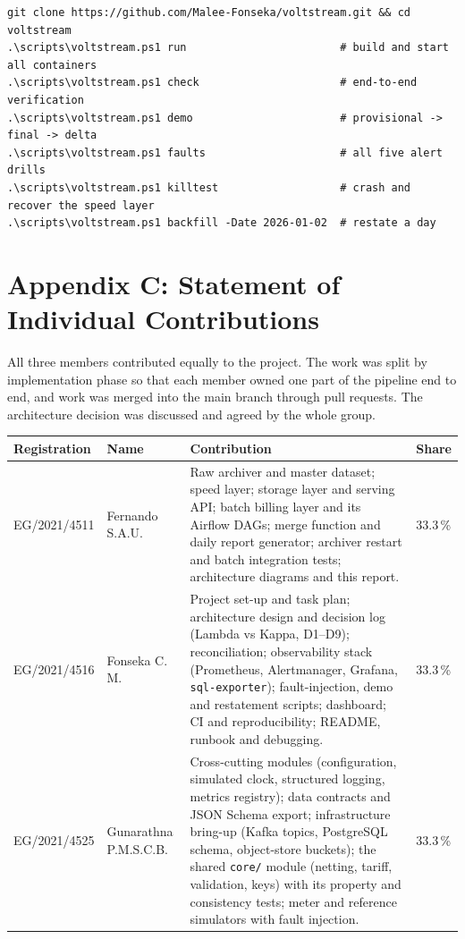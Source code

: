 \documentclass[11pt,a4paper]{article}
\begin{document}
\begin{lstlisting}[caption={From a clean clone to every result (Windows; each has a \texttt{make} equivalent on Linux).}]
git clone https://github.com/Malee-Fonseka/voltstream.git && cd voltstream
.\scripts\voltstream.ps1 run                        # build and start all containers
.\scripts\voltstream.ps1 check                      # end-to-end verification
.\scripts\voltstream.ps1 demo                       # provisional -> final -> delta
.\scripts\voltstream.ps1 faults                     # all five alert drills
.\scripts\voltstream.ps1 killtest                   # crash and recover the speed layer
.\scripts\voltstream.ps1 backfill -Date 2026-01-02  # restate a day
\end{lstlisting}

{}
\section*{Appendix C: Statement of Individual Contributions}

All three members contributed equally to the project. The work was split by
implementation phase so that each member owned one part of the pipeline end to end, and
work was merged into the main branch through pull requests. The architecture decision was
discussed and agreed by the whole group.

\begin{table}[!htbp]
\centering
\small
\begin{tabularx}{\textwidth}{L{2.4cm} L{2.8cm} X L{1.2cm}}
\toprule
\textbf{Registration} & \textbf{Name} & \textbf{Contribution} & \textbf{Share} \\
\midrule
EG/2021/4511 & Fernando S.A.U. &
Raw archiver and master dataset; speed layer; storage layer and serving API; batch
billing layer and its Airflow DAGs; merge function and daily report generator; archiver
restart and batch integration tests; architecture diagrams and this report. &
33.3\,\% \\
\addlinespace
EG/2021/4516 & Fonseka C. M. &
Project set-up and task plan; architecture design and decision log (Lambda vs Kappa,
D1--D9); reconciliation; observability stack (Prometheus, Alertmanager, Grafana,
\texttt{sql-exporter}); fault-injection, demo and restatement scripts; dashboard; CI and
reproducibility; README, runbook and debugging. &
33.3\,\% \\
\addlinespace
EG/2021/4525 & Gunarathna P.M.S.C.B. &
Cross-cutting modules (configuration, simulated clock, structured logging, metrics
registry); data contracts and JSON Schema export; infrastructure bring-up (Kafka topics,
PostgreSQL schema, object-store buckets); the shared \texttt{core/} module (netting,
tariff, validation, keys) with its property and consistency tests; meter and reference
simulators with fault injection. &
33.3\,\% \\
\bottomrule
\end{tabularx}
\end{table}
\end{document}
